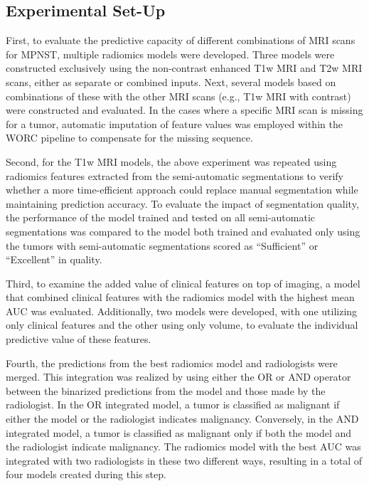 \subsection{Experimental Set-Up}
First, to evaluate the predictive capacity of different combinations of MRI scans for MPNST, multiple radiomics models were developed.
Three models were constructed exclusively using the non-contrast enhanced T1w MRI and T2w MRI scans, either as separate or combined inputs.
Next, several models based on combinations of these with the other MRI scans (e.g., T1w MRI with contrast) were constructed and evaluated.
In the cases where a specific MRI scan is missing for a tumor, automatic imputation of feature values was employed within the WORC pipeline to compensate for the missing sequence.

Second, for the T1w MRI models, the above experiment was repeated using radiomics features extracted from the semi-automatic segmentations to verify whether a more time-efficient approach could replace manual segmentation while maintaining prediction accuracy.
To evaluate the impact of segmentation quality, the performance of the model trained and tested on all semi-automatic segmentations was compared to the model both trained and evaluated only using the tumors with semi-automatic segmentations scored as ``Sufficient'' or ``Excellent'' in quality.

Third, to examine the added value of clinical features on top of imaging, a model that combined clinical features with the radiomics model with the highest mean AUC was evaluated.
Additionally, two models were developed, with one utilizing only clinical features and the other using only volume, to evaluate the individual predictive value of these features.

Fourth, the predictions from the best radiomics model and radiologists were merged.
This integration was realized by using either the OR or AND operator between the binarized predictions from the model and those made by the radiologist.
In the OR integrated model, a tumor is classified as malignant if either the model or the radiologist indicates malignancy.
Conversely, in the AND integrated model, a tumor is classified as malignant only if both the model and the radiologist indicate malignancy.
The radiomics model with the best AUC was integrated with two radiologists in these two different ways, resulting in a total of four models created during this step.


